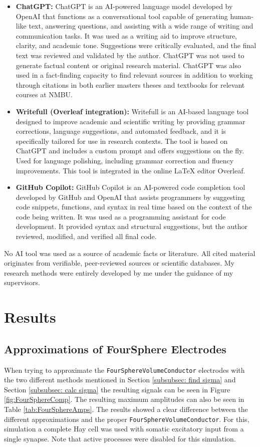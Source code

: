 \documentclass[final, a4paper,masters,en,listoffigures,listoftables,norwegiandates]{NMBU}
\begin{document}
\begin{itemize}
    \item \textbf{ChatGPT:} ChatGPT is an AI-powered language model developed by OpenAI that functions as a conversational tool capable of generating human-like text, answering questions, and assisting with a wide range of writing and communication tasks. It was used as a writing aid to improve structure, clarity, and academic tone. Suggestions were critically evaluated, and the final text was reviewed and validated by the author. ChatGPT was not used to generate factual content or original research material. ChatGPT was also used in a fact-finding capacity to find relevant sources in addition to working through citations in both earlier masters theses and textbooks for relevant courses at NMBU.
    
    \item \textbf{Writefull (Overleaf integration):} Writefull is an AI-based language tool designed to improve academic and scientific writing by providing grammar corrections, language suggestions, and automated feedback, and it is specifically tailored for use in research contexts. The tool is based on ChatGPT and includes a custom prompt and offers suggestions on the fly. Used for language polishing, including grammar correction and fluency improvements. This tool is integrated in the online LaTeX editor Overleaf. 
    
    \item \textbf{GitHub Copilot:} GitHub Copilot is an AI-powered code completion tool developed by GitHub and OpenAI that assists programmers by suggesting code snippets, functions, and syntax in real time based on the context of the code being written. It was used as a programming assistant for code development. It provided syntax and structural suggestions, but the author reviewed, modified, and verified all final code.
\end{itemize}

No AI tool was used as a source of academic facts or literature. All cited material originates from verifiable, peer-reviewed sources or scientific databases. My research methods were entirely developed by me under the guidance of my supervisors. 

\clearpage
\section{Results}
\subsection{Approximations of FourSphere Electrodes}
When trying to approximate the \texttt{FourSphereVolumeConductor} electrodes with the two different methods mentioned in Section \ref{subsubsec: find sigma} and Section \ref{subsubsec: calc sigma} the resulting signals can be seen in Figure \ref{fig:FourSphereComp}. The resulting maximum amplitudes can also be seen in Table \ref{tab:FourSphereAmps}. The results showed a clear difference between the different approximations and the proper \texttt{FourSphereVolumeConductor}. For this, simulation a complete Hay cell was used with somatic excitatory input from a single synapse. Note that active processes were disabled for this simulation. 
\end{document}
